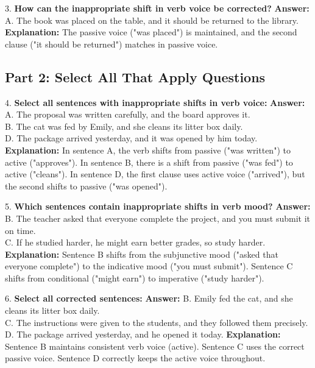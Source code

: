 \documentclass[12pt]{article}
\begin{document}
\vspace{1cm}
3. \textbf{How can the inappropriate shift in verb voice be corrected?}  
\textbf{Answer:} A. The book was placed on the table, and it should be returned to the library.  
\textbf{Explanation:} The passive voice ("was placed") is maintained, and the second clause ("it should be returned") matches in passive voice.

\subsection*{Part 2: Select All That Apply Questions}

4. \textbf{Select all sentences with inappropriate shifts in verb voice:}  
\textbf{Answer:} A. The proposal was written carefully, and the board approves it. \\
B. The cat was fed by Emily, and she cleans its litter box daily. \\
D. The package arrived yesterday, and it was opened by him today.  
\textbf{Explanation:} In sentence A, the verb shifts from passive ("was written") to active ("approves"). In sentence B, there is a shift from passive ("was fed") to active ("cleans"). In sentence D, the first clause uses active voice ("arrived"), but the second shifts to passive ("was opened").  

\vspace{1cm}
5. \textbf{Which sentences contain inappropriate shifts in verb mood?}  
\textbf{Answer:} B. The teacher asked that everyone complete the project, and you must submit it on time. \\
C. If he studied harder, he might earn better grades, so study harder.  
\textbf{Explanation:} Sentence B shifts from the subjunctive mood ("asked that everyone complete") to the indicative mood ("you must submit"). Sentence C shifts from conditional ("might earn") to imperative ("study harder").

\vspace{1cm}
6. \textbf{Select all corrected sentences:}  
\textbf{Answer:} B. Emily fed the cat, and she cleans its litter box daily. \\
C. The instructions were given to the students, and they followed them precisely. \\
D. The package arrived yesterday, and he opened it today.  
\textbf{Explanation:} Sentence B maintains consistent verb voice (active). Sentence C uses the correct passive voice. Sentence D correctly keeps the active voice throughout.
\end{document}

